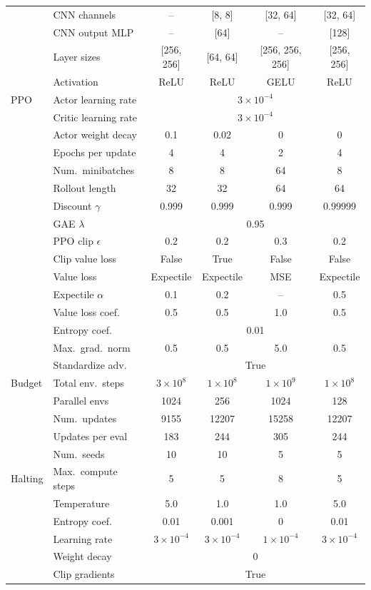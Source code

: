 \begin{table}[p]
\begin{tabular}{llcccc}
  & CNN channels & -- & [8, 8] & [32, 64] & [32, 64] \\
  & CNN output MLP & -- & [64] & -- & [128] \\
  & Layer sizes & [256, 256] & [64, 64] & [256, 256, 256] & [256, 256] \\
  & Activation & ReLU & ReLU & GELU & ReLU \\
\midrule
PPO
  & Actor learning rate & \multicolumn{4}{c}{$3\times10^{-4}$} \\
  & Critic learning rate & \multicolumn{4}{c}{$3\times10^{-4}$} \\
  & Actor weight decay & 0.1 & 0.02 & 0 & 0 \\
  & Epochs per update & 4 & 4 & 2 & 4 \\
  & Num.\ minibatches & 8 & 8 & 64 & 8 \\
  & Rollout length & 32 & 32 & 64 & 64 \\
  & Discount $\gamma$ & 0.999 & 0.999 & 0.999 & 0.99999 \\
  & GAE $\lambda$ & \multicolumn{4}{c}{0.95} \\
  & PPO clip $\epsilon$ & 0.2 & 0.2 & 0.3 & 0.2 \\
  & Clip value loss & False & True & False & False \\
  & Value loss & Expectile & Expectile & MSE & Expectile \\
  & Expectile $\alpha$ & 0.1 & 0.2 & -- & 0.5 \\
  & Value loss coef. & 0.5 & 0.5 & 1.0 & 0.5 \\
  & Entropy coef. & \multicolumn{4}{c}{0.01} \\
  & Max.\ grad.\ norm & 0.5 & 0.5 & 5.0 & 0.5 \\
  & Standardize adv. & \multicolumn{4}{c}{True} \\
\midrule
Budget
  & Total env.\ steps & $3\times10^{8}$ & $1\times10^{8}$ & $1\times10^{9}$ & $1\times10^{8}$ \\
  & Parallel envs & 1024 & 256 & 1024 & 128 \\
  & Num.\ updates & 9155 & 12207 & 15258 & 12207 \\
  & Updates per eval & 183 & 244 & 305 & 244 \\
  & Num.\ seeds & 10 & 10 & 5 & 5 \\
\midrule
Halting
  & Max.\ compute steps & 5 & 5 & 8 & 5 \\
  & Temperature & 5.0 & 1.0 & 1.0 & 5.0 \\
  & Entropy coef. & 0.01 & 0.001 & 0 & 0.01 \\
  & Learning rate & $3\times10^{-4}$ & $3\times10^{-4}$ & $1\times10^{-4}$ & $3\times10^{-4}$ \\
  & Weight decay & \multicolumn{4}{c}{0} \\
  & Clip gradients & \multicolumn{4}{c}{True} \\
\bottomrule
\end{tabular}
\label{tab:hyperparams_main}
\end{table}

